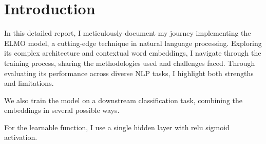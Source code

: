 \section*{Introduction}
\label{sec:introduction}
In this detailed report, I meticulously document my journey implementing the ELMO model, a cutting-edge technique in natural language processing. Exploring its complex architecture and contextual word embeddings, I navigate through the training process, sharing the methodologies used and challenges faced. Through evaluating its performance across diverse NLP tasks, I highlight both strengths and limitations. 

We also train the model on a downstream classification task, combining the embeddings in several possible ways.

For the learnable function, I use a single hidden layer with relu sigmoid activation.
